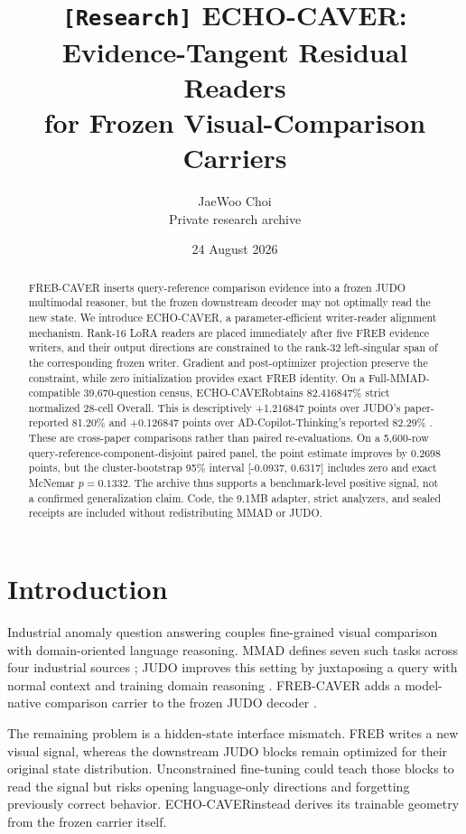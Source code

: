 \documentclass[10pt]{article}
\title{\texttt{[Research]} ECHO-CAVER: Evidence-Tangent Residual Readers\\for Frozen Visual-Comparison Carriers}
\author{JaeWoo Choi\\Private research archive}
\date{24 August 2026}
\newcommand{\method}{\textsc{ECHO-CAVER}}
\begin{document}
\maketitle

\begin{abstract}
FREB-CAVER inserts query-reference comparison evidence into a frozen JUDO
multimodal reasoner, but the frozen downstream decoder may not optimally read
the new state. We introduce \method, a parameter-efficient writer-reader
alignment mechanism. Rank-16 LoRA readers are placed immediately after five
FREB evidence writers, and their output directions are constrained to the
rank-32 left-singular span of the corresponding frozen writer. Gradient and
post-optimizer projection preserve the constraint, while zero initialization
provides exact FREB identity. On a Full-MMAD-compatible 39,670-question census,
\method obtains 82.416847\% strict normalized 28-cell Overall. This is
descriptively +1.216847 points over JUDO's paper-reported 81.20\% and +0.126847
points over AD-Copilot-Thinking's reported 82.29\% \cite{kang2026judo,jiang2026adcopilot}.
These are cross-paper comparisons rather than paired re-evaluations. On a 5,600-row
query-reference-component-disjoint paired panel, the point estimate improves
by 0.2698 points, but the cluster-bootstrap 95\% interval
[-0.0937, 0.6317] includes zero and exact McNemar $p=0.1332$. The archive thus
supports a benchmark-level positive signal, not a confirmed generalization
claim. Code, the 9.1MB adapter, strict analyzers, and sealed receipts are
included without redistributing MMAD or JUDO.
\end{abstract}

\section{Introduction}
Industrial anomaly question answering couples fine-grained visual comparison
with domain-oriented language reasoning. MMAD defines seven such tasks across
four industrial sources \cite{jiang2024mmad}; JUDO improves this setting by
juxtaposing a query with normal context and training domain reasoning
\cite{kang2026judo}. FREB-CAVER adds a model-native comparison carrier to the
frozen JUDO decoder \cite{frebcaver2026}.

The remaining problem is a hidden-state interface mismatch. FREB writes a new
visual signal, whereas the downstream JUDO blocks remain optimized for their
original state distribution. Unconstrained fine-tuning could teach those
blocks to read the signal but risks opening language-only directions and
forgetting previously correct behavior. \method instead derives its trainable
geometry from the frozen carrier itself.
\end{document}
